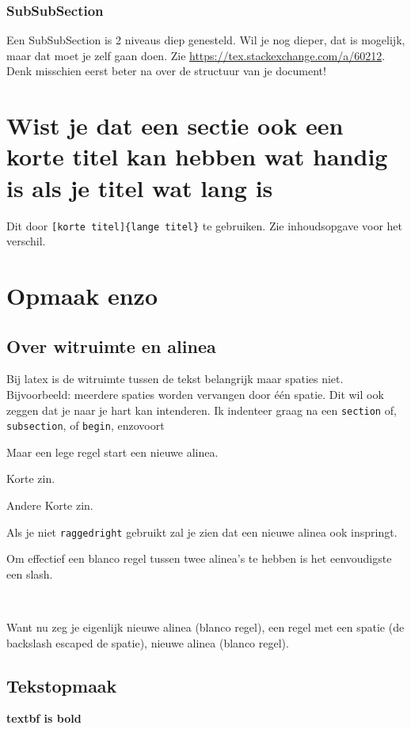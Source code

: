 \documentclass{article} %
\begin{document}
			\subsubsection{SubSubSection}
				\label{subsubsec:subsubsec}
				Een SubSubSection is 2 niveaus diep genesteld.
				Wil je nog dieper, dat is mogelijk, maar dat moet je zelf gaan doen.
				Zie \url{https://tex.stackexchange.com/a/60212}.
				Denk misschien eerst beter na over de structuur van je document!
				
	\section[Echte titel is langer]{Wist je dat een sectie ook een korte titel kan hebben wat handig is als je titel wat lang is}
		Dit door \texttt{[korte titel]\{lange titel\}} te gebruiken.
		Zie inhoudsopgave voor het verschil. 
		
	\newpage
		
	\section{Opmaak enzo}
		\subsection{Over witruimte en alinea}
			Bij latex is de witruimte tussen de tekst belangrijk maar spaties niet.
			Bijvoorbeeld:            meerdere               spaties         worden vervangen door \'e\'en spatie.
			Dit wil ook zeggen dat je naar je hart kan intenderen. Ik indenteer graag na een \texttt{section} of, \texttt{subsection}, of \texttt{begin}, enzovoort
			
			Maar een lege regel start een nieuwe alinea.
			
			Korte zin.
			
			Andere Korte zin.
			
			Als je niet \texttt{raggedright} gebruikt zal je zien dat een nieuwe alinea ook inspringt.
			
			Om effectief een blanco regel tussen twee alinea's te hebben is het eenvoudigste een slash. 
			
			\
			
			Want nu zeg je eigenlijk nieuwe alinea (blanco regel), een regel met een spatie (de backslash escaped de spatie), nieuwe alinea (blanco regel).
			
		\subsection{Tekstopmaak}
			\textbf{textbf is bold}
			
\end{document}
